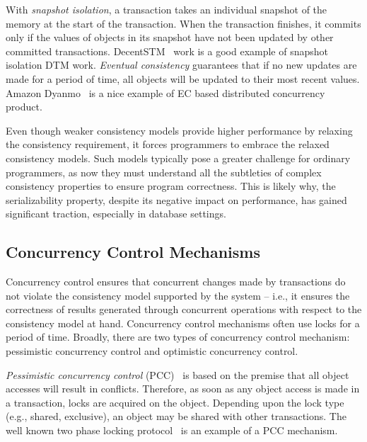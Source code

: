 \documentclass[12pt,english]{report}
\begin{document}
With \textit{snapshot isolation}, a transaction takes an individual snapshot of the memory at the start of the transaction. When the transaction finishes, it commits only if the values of objects in its snapshot have not been updated by other committed transactions. DecentSTM~\cite{DecentSTM:5470446} work is a good example of snapshot isolation DTM work. \textit{Eventual consistency} guarantees that if no new updates are made for a period of time, all objects will be updated to their most recent values. Amazon Dyanmo~\cite{DeCandia:2007:DAH:1294261.1294281} is a nice example of EC based distributed concurrency product.

Even though weaker consistency models provide higher performance by relaxing the consistency requirement, it forces programmers to embrace the relaxed consistency models. Such models typically pose a greater challenge for ordinary programmers, as now they must understand all the subtleties of complex consistency properties to ensure program correctness. This is likely why, the serializability property, despite its negative impact on performance, has gained significant traction, especially in database settings. 


\subsection{Concurrency Control Mechanisms} 

Concurrency control ensures that concurrent changes made by transactions do not violate the consistency model supported by the system -- i.e., it ensures the correctness of results generated through concurrent operations with respect to the consistency model at hand. Concurrency control mechanisms often use locks for a period of time. Broadly, there are two types of concurrency control mechanism: pessimistic concurrency control and optimistic concurrency control.

\textit{Pessimistic concurrency control} (PCC)~\cite{PessCon:1311029} is based on the premise that all object accesses will result in conflicts. Therefore, as soon as any object access is made in a transaction, locks are acquired on the object. Depending upon the lock type (e.g., shared, exclusive), an object may be shared with other transactions. The well known two phase locking protocol~\cite{2PL:lin1983basic} is an example of a PCC mechanism.  
\end{document}
